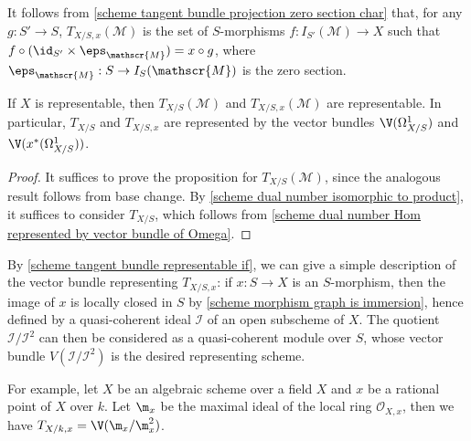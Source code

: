 \begin{remark}
It follows from \cref{scheme tangent bundle projection zero section char} that, for any $g:S'\to S$, $T_{X/S,x}(\mathscr{M})$ is the set of $S$-morphisms $f:I_{S'}(\mathscr{M})\to X$ such that $f\circ(\id_{S'}\times\eps_\mathscr{M})=x\circ g$, where $\eps_\mathscr{M}:S\to I_{S}(\mathscr{M})$ is the zero section.
\end{remark}

\begin{proposition}\label{scheme tangent bundle representable if}
If $X$ is representable, then $T_{X/S}(\mathscr{M})$ and $T_{X/S,x}(\mathscr{M})$ are representable. In particular, $T_{X/S}$ and $T_{X/S,x}$ are represented by the vector bundles $\V(\Omega_{X/S}^1)$ and $\V(x^*(\Omega_{X/S}^1))$.
\end{proposition}
\begin{proof}
It suffices to prove the proposition for $T_{X/S}(\mathscr{M})$, since the analogous result follows from base change. By \cref{scheme dual number isomorphic to product}, it suffices to consider $T_{X/S}$, which follows from \cref{scheme dual number Hom represented by vector bundle of Omega}.
\end{proof}

\begin{remark}
By \cref{scheme tangent bundle representable if}, we can give a simple description of the vector bundle representing $T_{X/S,x}$: if $x:S\to X$ is an $S$-morphism, then the image of $x$ is locally closed in $S$ by \cref{scheme morphism graph is immersion}, hence defined by a quasi-coherent ideal $\mathscr{I}$ of an open subscheme of $X$. The quotient $\mathscr{I}/\mathscr{I}^2$ can then be considered as a quasi-coherent module over $S$, whose vector bundle $V(\mathscr{I}/\mathscr{I}^2)$ is the desired representing scheme.\par
For example, let $X$ be an algebraic scheme over a field $X$ and $x$ be a rational point of $X$ over $k$. Let $\m_x$ be the maximal ideal of the local ring $\mathscr{O}_{X,x}$, then we have $T_{X/k,x}=\V(\m_x/\m_x^2)$.
\end{remark}
